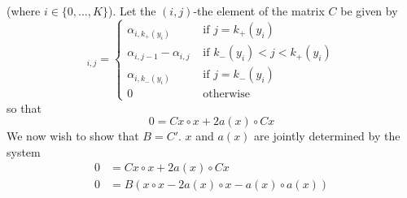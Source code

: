 \documentclass[12pt]{article}
\begin{document}
(where $i\in\{0,\ldots,K\}$). Let the $(i,j)$-the element of the matrix $C$ be given by
\begin{equation}
	[C]_{i,j}=
	\begin{cases}
		\alpha_{i,k_{+}(y_{i})} & \text{ if } j=k_{+}(y_{i}) \\
		\alpha_{i,j-1}-\alpha_{i,j} & \text{ if } k_{-}(y_{i})<j<k_{+}(y_{i})\\
		\alpha_{i,k_{-}(y_{i})} & \text{ if } j=k_{-}(y_{i}) \\
		0 & \text{ otherwise }
	\end{cases}
\end{equation}
so that
\begin{equation}
	0=Cx\circ x+2a(x)\circ Cx
\end{equation}
We now wish to show that $B=C'$. $x$ and $a(x)$ are jointly determined by the system
\begin{align}
	0&=Cx\circ x+2a(x)\circ Cx\\
	0&=B\left(x\circ x-2a(x)\circ x-a(x)\circ a(x)\right)
\end{align}
\end{document}
